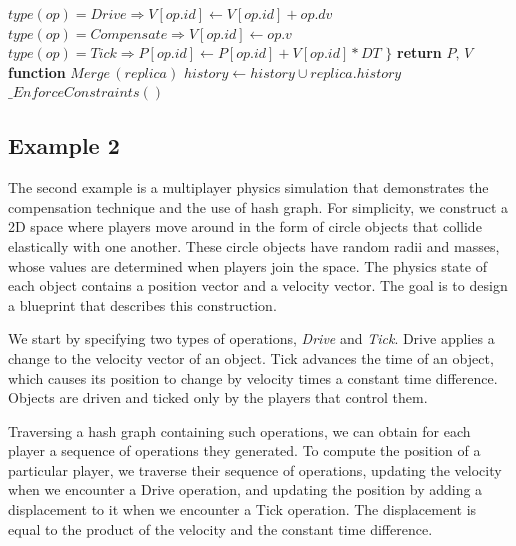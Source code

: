 \documentclass{article}
\begin{document}
\begin{algorithm}
\begin{algorithmic}
\State \hspace{\algorithmicindent}\hspace{\algorithmicindent} $type(op) = Drive \Rightarrow V[op.id] \leftarrow V[op.id] + op.dv$
\State \hspace{\algorithmicindent}\hspace{\algorithmicindent} $type(op) = Compensate \Rightarrow V[op.id] \leftarrow op.v$
\State \hspace{\algorithmicindent}\hspace{\algorithmicindent} $type(op) = Tick \Rightarrow P[op.id] \leftarrow P[op.id] + V[op.id] * DT$
\State {}
\State \hspace{\algorithmicindent} $\}$
\State \hspace{\algorithmicindent} \textbf{return} $P,\,V$
\State
\State \textbf{function} $Merge\,(replica)$
\State \hspace{\algorithmicindent} $history \leftarrow history \cup replica.history$ 
\State \hspace{\algorithmicindent} $\_EnforceConstraints()$
\end{algorithmic}
\end{algorithm}

\subsection{Example 2}

The second example is a multiplayer physics simulation that demonstrates the compensation technique and the use of hash graph. For simplicity, we construct a 2D space where players move around in the form of circle objects that collide elastically with one another. These circle objects have random radii and masses, whose values are determined when players join the space. The physics state of each object contains a position vector and a velocity vector. The goal is to design a blueprint that describes this construction.

We start by specifying two types of operations, \textit{Drive} and \textit{Tick}. Drive applies a change to the velocity vector of an object. Tick advances the time of an object, which causes its position to change by velocity times a constant time difference. Objects are driven and ticked only by the players that control them.

Traversing a hash graph containing such operations, we can obtain for each player a sequence of operations they generated. To compute the position of a particular player, we traverse their sequence of operations, updating the velocity when we encounter a Drive operation, and updating the position by adding a displacement to it when we encounter a Tick operation. The displacement is equal to the product of the velocity and the constant time difference. 
\end{document}
